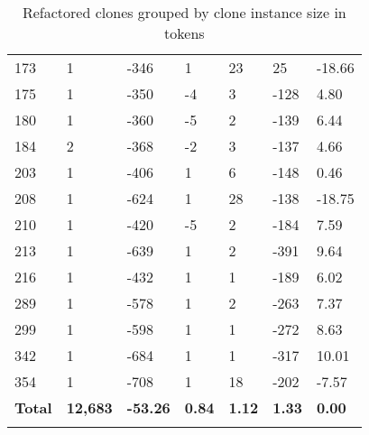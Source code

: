 \begin{appendices}
\begin{longtable}[c]{@{}lllllll@{}}
\rowcolor[HTML]{FFCCC9}
173 & 1 & -346 & 1 & 23 & 25 & -18.66 \\
\rowcolor[HTML]{FFCCC9}
175 & 1 & -350 & -4 & 3 & -128 & 4.80 \\
\rowcolor[HTML]{FFCCC9}
180 & 1 & -360 & -5 & 2 & -139 & 6.44 \\
\rowcolor[HTML]{FFCCC9}
184 & 2 & -368 & -2 & 3 & -137 & 4.66 \\
\rowcolor[HTML]{FFCCC9}
203 & 1 & -406 & 1 & 6 & -148 & 0.46 \\
\rowcolor[HTML]{FFCCC9}
208 & 1 & -624 & 1 & 28 & -138 & -18.75 \\
\rowcolor[HTML]{FFCCC9}
210 & 1 & -420 & -5 & 2 & -184 & 7.59 \\
\rowcolor[HTML]{FFCCC9}
213 & 1 & -639 & 1 & 2 & -391 & 9.64 \\
\rowcolor[HTML]{FFCCC9}
216 & 1 & -432 & 1 & 1 & -189 & 6.02 \\
\rowcolor[HTML]{FFCCC9}
289 & 1 & -578 & 1 & 2 & -263 & 7.37 \\
\rowcolor[HTML]{FFCCC9}
299 & 1 & -598 & 1 & 1 & -272 & 8.63 \\
\rowcolor[HTML]{FFCCC9}
342 & 1 & -684 & 1 & 1 & -317 & 10.01 \\
\rowcolor[HTML]{FFCCC9}
354 & 1 & -708 & 1 & 18 & -202 & -7.57 \\* \midrule
\textbf{Total} & \textbf{12,683} & \textbf{-53.26} & \textbf{0.84} & \textbf{1.12} & \textbf{1.33} & \textbf{0.00} \\* \bottomrule
\caption{Refactored clones grouped by clone instance size in tokens}
\label{tab:full_token_refactoring}\\
\end{longtable}


\end{appendices}

